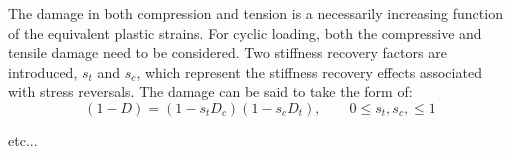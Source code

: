 
The damage in both compression and tension is a necessarily increasing
function of the equivalent plastic strains. For cyclic loading, both the compressive and tensile damage need to
be considered. Two stiffness recovery factors are introduced, $s_{t}$
and $s_{c}$, which represent the stiffness recovery effects associated
with stress reversals. The damage can be said to take the form of:
\begin{equation}
(1-D)=(1-s_{t}D_{c})(1-s_{c}D_{t}),\qquad0\leq s_{t},s_{c},\leq1\label{eqn:dam4}
\end{equation}

etc...
